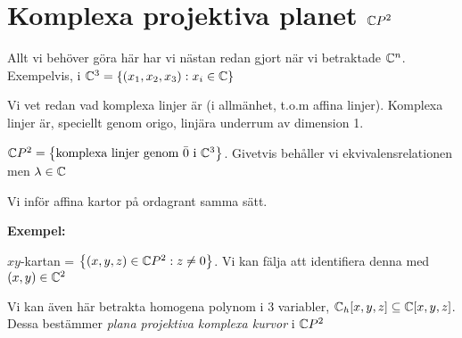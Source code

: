 \section{Komplexa projektiva planet $\mathbb{C} P^2$}\par
\noindent Allt vi behöver göra här har vi nästan redan gjort när vi betraktade $\mathbb{C}^n$. Exempelvis, i $\mathbb{C}^3 = \left\{(x_1,x_2,x_3):x_i\in\mathbb{C}\right\}$\par
\noindent Vi vet redan vad komplexa linjer är (i allmänhet, t.o.m affina linjer). Komplexa linjer är, speciellt genom origo, linjära underrum av dimension 1.
\par\bigskip
\noindent $\mathbb{C} P^2  = \left\{\text{komplexa linjer genom }\bar{0}\text{ i }\mathbb{C}^3\right\}$. Givetvis behåller vi ekvivalensrelationen men $\lambda\in\mathbb{C}$
\par\bigskip
\noindent Vi inför affina kartor på ordagrant samma sätt. 
\par\bigskip
\noindent\textbf{Exempel:}\par
\noindent $xy$-kartan = $\left\{(x,y,z)\in\mathbb{C} P^2:z\neq0\right\}$. Vi kan fälja att identifiera denna med $(x,y)\in\mathbb{C}^2$
\par\bigskip
\noindent Vi kan även här betrakta homogena polynom i 3 variabler, $\mathbb{C}_h[x,y,z] \subseteq \mathbb{C}[x,y,z]$. Dessa bestämmer \textit{plana projektiva komplexa kurvor} i $\mathbb{C} P^2$
\par\bigskip
